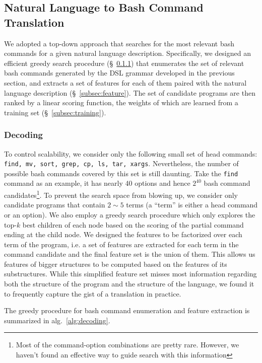 \subsection{Natural Language to Bash Command Translation}
\label{subsec:parser}

We adopted a top-down approach that searches for the most relevant bash commands for a given natural language description. Specifically, we designed an efficient greedy search procedure (\S~\ref{subsec:decoding}) that enumerates the set of relevant bash commands generated by the DSL grammar developed in the previous section, and extracts a set of features for each of them paired with the natural language description (\S~\ref{subsec:feature}). The set of candidate programs are then ranked by a linear scoring function, the weights of which are learned from a training set (\S~\ref{subsec:training}). 

\subsubsection{Decoding}
\label{subsec:decoding}

To control scalability, we consider only the following small set of head commands: \texttt{find, mv, sort, grep, cp, ls, tar, xargs}. Nevertheless, the number of possible bash commands covered by this set is still daunting. Take the \texttt{find} command as an example, it has nearly 40 options and hence $2^{40}$ bash command candidates\footnote{Most of the command-option combinations are pretty rare. However, we haven't found an effective way to guide search with this information}. To prevent the search space from blowing up, we consider only candidate programs that contain $2\sim 5$ terms (a ``term'' is either a head command or an option). We also employ a greedy search procedure which only explores the top-$k$ best children of each node based on the scoring of the partial command ending at the child node. We designed the features to be factorized over each term of the program, i.e. a set of features are extracted for each term in the command candidate and the final feature set is the union of them. This allows us features of bigger structures to be computed based on the features of its substructures. While this simplified feature set misses most information regarding both the structure of the program and the structure of the language, we found it to frequently capture the gist of a translation in practice. 

The greedy procedure for bash command enumeration and feature extraction is summarized in alg.~\ref{alg:decoding}.

